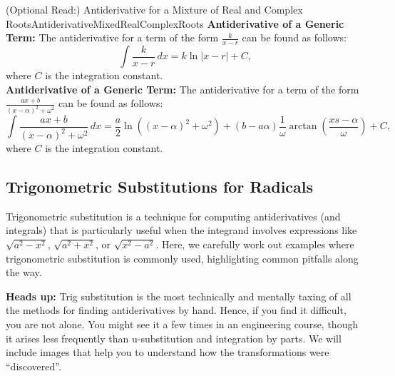 \begin{propColor}{(Optional Read:) Antiderivative for a Mixture of Real and Complex Roots}{AntiderivativeMixedRealComplexRoots}
\textbf{Antiderivative of a Generic Term:} The antiderivative for a term of the form $\frac{k}{x-r}$ can be found as follows:
\begin{equation}
    \int \frac{k}{x-r} \, dx =  k \ln|x-r| + C,
\end{equation}
where $C$ is the integration constant.\\


\textbf{Antiderivative of a Generic Term:} The antiderivative for a term of the form $\frac{a x + b}{(x - \alpha)^2 + \omega^2}$ can be found as follows:
\begin{equation}
    \int \frac{a x + b}{(x - \alpha)^2 + \omega^2} \, dx = \frac{a}{2} \ln\left((x - \alpha)^2 + \omega^2\right) + \left(b - a\alpha\right) \frac{1}{\omega} \arctan\left(\frac{xs - \alpha}{\omega}\right) + C,
\end{equation}
where $C$ is the integration constant.  
\end{propColor}

\bigskip






\subsection{Trigonometric Substitutions for Radicals}
\label{sec:trigSubstitutions}

Trigonometric substitution is a technique for computing antiderivatives (and integrals) that is particularly useful when the integrand involves expressions like \( \sqrt{a^2 - x^2} \), \( \sqrt{a^2 + x^2} \), or \( \sqrt{x^2 - a^2} \). Here, we carefully work out examples where trigonometric substitution is commonly used, highlighting common pitfalls along the way. 

\bigskip
\textbf{Heads up:} Trig substitution is the most technically and mentally taxing of all the methods for finding antiderivatives by hand. Hence, if you find it difficult, you are not alone. You might see it a few times in an engineering course, though it arises less frequently than u-substitution and integration by parts. We will include images that help you to understand how the transformations were ``discovered''.
\bigskip

